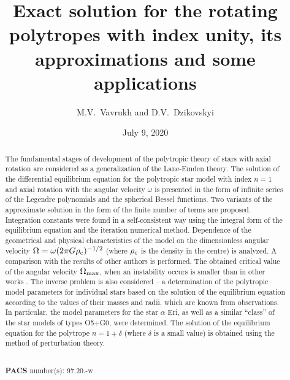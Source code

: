 \documentclass{caosp308}
\begin{document}
\title{Exact solution for the rotating polytropes with index unity, its approximations and some applications}

\author{
		M.V.\, Vavrukh and 
		D.V.\, Dzikovskyi
		}


\date{July 9, 2020}
\maketitle
\begin{abstract}
The fundamental stages of development of the polytropic theory of stars with axial rotation are considered as a generalization of the Lane-Emden theory. The solution of the differential equilibrium equation for the polytropic star model with index $n=1$ and axial rotation with the angular velocity $\omega$ is presented in the form of infinite series of the Legendre polynomials and the spherical Bessel functions. Two variants of the approximate solution in the form of the finite number of terms are proposed. Integration constants were found in a self-consistent way using the integral form of the equilibrium equation and the iteration numerical method. Dependence of the geometrical and physical characteristics of the model on the dimensionless angular velocity $\Omega=\omega(2\pi G\rho_{\rm c})^{-1/2}$ (where $\rho_{\rm c}$ is the density in the centre) is analyzed. A comparison with the results of other authors is performed. The obtained critical value of the angular velocity $\Omega_{\rm max}$, when an instability occurs  is smaller than in other works  \citep[and et al.]{1933MNRAS..93..390C,1964ApJ...140..552J}. The inverse problem is also considered -- a determination of the polytropic model parameters for individual stars based on the solution of the equilibrium equation according to the values of their masses and radii, which are known from observations. In particular, the model parameters for the star $\alpha$ Eri, as well as a similar ``class'' of the star models of types O5$\div$G0, were determined. The solution of the equilibrium equation for the polytrope $n=1+\delta$ (where $\delta$ is a small value) is obtained using the method of perturbation theory.

\\
{\bf PACS} number(s): 97.20.-w
\end{abstract}
\end{document}
